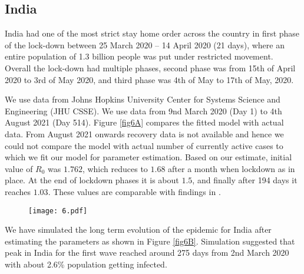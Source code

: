 \documentclass[10pt]{wlscirep}
\begin{document}
\subsection*{India}
India had one of the most strict stay home order across the country in first phase of the lock-down between 25 March 2020 – 14 April 2020 (21 days), where an entire population of 1.3 billion people was put under restricted movement. Overall the lock-down had multiple phases, second phase was from 15th of April 2020 to 3rd of May 2020, and third phase was 4th of May to 17th of May, 2020.

We use data from Johns Hopkins University Center for Systems Science and Engineering (JHU CSSE). We use data from 9nd March 2020 (Day 1) to 4th August 2021 (Day 514). Figure \ref{fig6A} compares the fitted model with actual data. From August 2021 onwards  recovery data is not available and hence we could not compare the model with actual number of currently active cases  to which we fit our model for parameter estimation. Based on our estimate, initial value of $R_0$ was $1.762$, which reduces to $1.68$ after a month when lockdown as in place. At the end of lockdown phases it is about $1.5$, and finally after 194 days it reaches $1.03$. These values are comparable with findings in \cite{Chhabra2020.07.10.20150631,MARIMUTHU2020}.

\begin{figure*}[t!]
	\centering
	\begin{subfigure}[b]{\textwidth}
		\centering
		\texttt{[image: 6.pdf]}
	\end{subfigure}
	\caption{Model simulation compared to real data (India) - Comparison between the official data (histogram) and the results with our model. Description of panels: \textbf{(a):} Number of currently active cases, $\left( Q(t) + H(t) + C(t)\right)$, \textbf{(b):} number of reported recovered individuals. $\int_{0}^{t}{\left( \mu Q(s) + \psi H(s) + \zeta  C(s) \right) ds}$, \textbf{(c):} Number of deceased individuals $D(t)$}
	\label{fig6A} 
\end{figure*}

We have simulated the long term evolution of the epidemic for India after estimating the parameters as shown in Figure \ref{fig6B}. Simulation suggested that peak in India for the first wave reached around 275 days from 2nd March 2020 with about 2.6\% population getting infected. 
\end{document}
